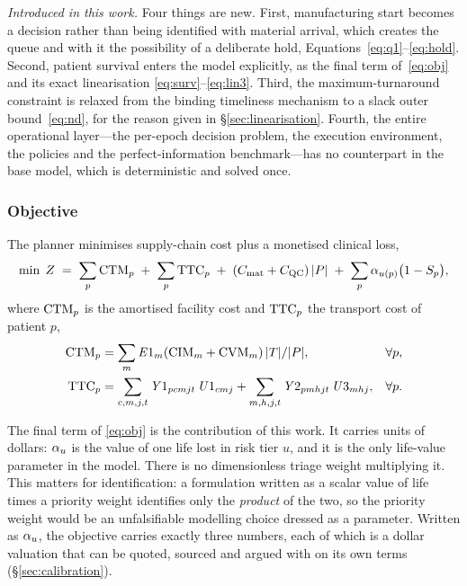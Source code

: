 \emph{Introduced in this work.} Four things are new. First, manufacturing start
becomes a decision rather than being identified with material arrival, which
creates the queue and with it the possibility of a deliberate hold,
Equations~\eqref{eq:q1}--\eqref{eq:hold}. Second, patient survival enters the
model explicitly, as the final term of~\eqref{eq:obj} and its exact
linearisation \eqref{eq:surv}--\eqref{eq:lin3}. Third, the maximum-turnaround
constraint is relaxed from the binding timeliness mechanism to a slack outer
bound~\eqref{eq:nd}, for the reason given in \S\ref{sec:linearisation}.
Fourth, the entire operational layer---the per-epoch decision problem, the
execution environment, the policies and the perfect-information
benchmark---has no counterpart in the base model, which is deterministic and
solved once.

\subsubsection{Objective}
\label{sec:objective}

The planner minimises supply-chain cost plus a monetised clinical loss,
\begin{equation}
  \min\; Z \;=\; \sum_{p} \mathrm{CTM}_p \;+\; \sum_{p} \mathrm{TTC}_p
  \;+\; (C_{\mathrm{mat}} + C_{\mathrm{QC}})\,|P| \;+\; \sum_{p} \alpha_{u(p)} \bigl(1 - S_p\bigr),
  \label{eq:obj}
\end{equation}
where $\mathrm{CTM}_p$ is the amortised facility cost and $\mathrm{TTC}_p$ the transport cost
of patient $p$,
\begin{align}
  \mathrm{CTM}_p &= \sum_{m} \mathit{E}1_m (\mathrm{CIM}_m + \mathrm{CVM}_m)\,|T| / |P|, & &\forall p, \label{eq:ctm}\\
  \mathrm{TTC}_p &= \sum_{c,m,j,t} \mathit{Y}1_{pcmjt}\, \mathit{U}1_{cmj}
            + \sum_{m,h,j,t} \mathit{Y}2_{pmhjt}\, \mathit{U}3_{mhj}, & &\forall p. \label{eq:ttc}
\end{align}

The final term of \eqref{eq:obj} is the contribution of this work. It carries
units of dollars: $\alpha_{u}$ is the value of one life lost in risk tier $u$, and
it is the only life-value parameter in the model. There is no dimensionless
triage weight multiplying it. This matters for identification: a formulation
written as a scalar value of life times a priority weight identifies only the
\emph{product} of the two, so the priority weight would be an unfalsifiable
modelling choice dressed as a parameter. Written as $\alpha_{u}$, the objective
carries exactly three numbers, each of which is a dollar valuation that can be
quoted, sourced and argued with on its own terms
(\S\ref{sec:calibration}).

